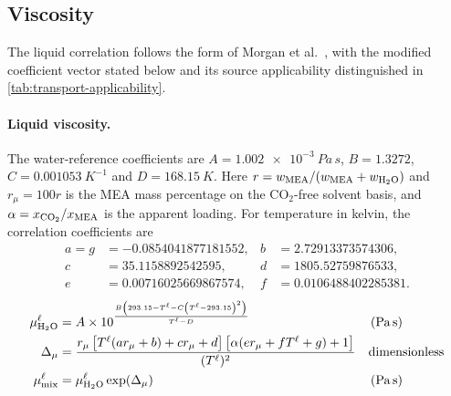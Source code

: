 \subsection{Viscosity}
The liquid correlation follows the form of Morgan et al.\ \cite{Morgan2015a}, with the modified coefficient vector stated below and its source applicability distinguished in \cref{tab:transport-applicability}.
\paragraph{Liquid viscosity.}
The water-reference coefficients are $A=\qty{1.002e-3}{Pa\,s}$, $B=1.3272$, $C=\qty{0.001053}{K^{-1}}$ and $D=\qty{168.15}{K}$.
Here \(r=w_{\MEA}/(w_{\MEA}+w_{\HtwoO})\) and $r_\mu=100r$ is the MEA mass percentage on the CO$_2$-free solvent basis, and $\alpha=x_{\COtwo}/x_{\MEA}$ is the apparent loading.
For temperature in kelvin, the correlation coefficients are
\begin{align*}
a=g&=-0.0854041877181552,& b&=2.72913373574306,\\
c&=35.1158892542595,& d&=1805.52759876533,\\
e&=0.00716025669867574,& f&=0.0106488402285381.
\end{align*}
\begin{align}
\mu ^{\liq}_{\HtwoO} &= A \times 10^\frac{B\left(293.15 - T^{\liq} - C\left(T^{\liq} - 293.15\right)^2\right)}{T^{\liq} - D}
&& \left(\unit{Pa\,s}\right)\\
\Delta_\mu &= \frac{r_\mu\left[T^{\liq}(a r_\mu+b)+c r_\mu+d\right]
\left[\alpha(e r_\mu+f T^{\liq}+g)+1\right]}{(T^{\liq})^2}
&& \text{dimensionless}\\
\mu ^{\liq}_{\text{mix}} &= \mu ^{\liq}_{\HtwoO} \exp(\Delta_\mu)
&& \left(\unit{Pa\,s}\right)
\end{align}
\vspace{.5cm}
